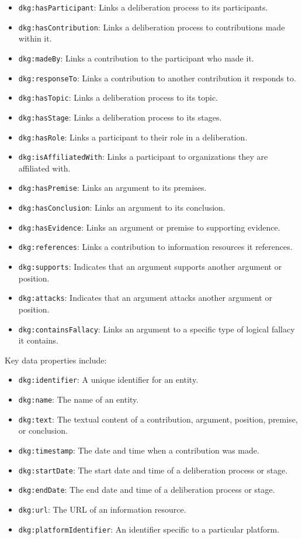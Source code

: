 \documentclass[runningheads]{llncs}  %
\begin{document}
\begin{itemize}
    \item \texttt{dkg:hasParticipant}: Links a deliberation process to its participants.
    \item \texttt{dkg:hasContribution}: Links a deliberation process to contributions made within it.
    \item \texttt{dkg:madeBy}: Links a contribution to the participant who made it.
    \item \texttt{dkg:responseTo}: Links a contribution to another contribution it responds to.
    \item \texttt{dkg:hasTopic}: Links a deliberation process to its topic.
    \item \texttt{dkg:hasStage}: Links a deliberation process to its stages.
    \item \texttt{dkg:hasRole}: Links a participant to their role in a deliberation.
    \item \texttt{dkg:isAffiliatedWith}: Links a participant to organizations they are affiliated with.
    \item \texttt{dkg:hasPremise}: Links an argument to its premises.
    \item \texttt{dkg:hasConclusion}: Links an argument to its conclusion.
    \item \texttt{dkg:hasEvidence}: Links an argument or premise to supporting evidence.
    \item \texttt{dkg:references}: Links a contribution to information resources it references.
    \item \texttt{dkg:supports}: Indicates that an argument supports another argument or position.
    \item \texttt{dkg:attacks}: Indicates that an argument attacks another argument or position.
    \item \texttt{dkg:containsFallacy}: Links an argument to a specific type of logical fallacy it contains.
\end{itemize}

Key data properties include:

\begin{itemize}
    \item \texttt{dkg:identifier}: A unique identifier for an entity.
    \item \texttt{dkg:name}: The name of an entity.
    \item \texttt{dkg:text}: The textual content of a contribution, argument, position, premise, or conclusion.
    \item \texttt{dkg:timestamp}: The date and time when a contribution was made.
    \item \texttt{dkg:startDate}: The start date and time of a deliberation process or stage.
    \item \texttt{dkg:endDate}: The end date and time of a deliberation process or stage.
    \item \texttt{dkg:url}: The URL of an information resource.
    \item \texttt{dkg:platformIdentifier}: An identifier specific to a particular platform.
\end{itemize}
\end{document}
